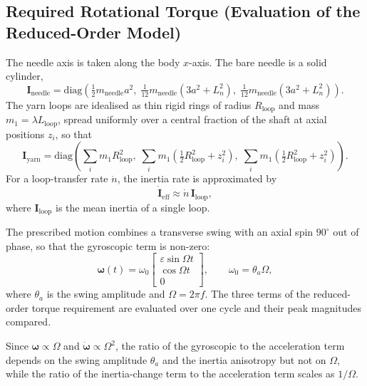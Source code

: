 \documentclass[12pt, a4paper]{article}
\begin{document}
\subsection{Required Rotational Torque (Evaluation of the Reduced-Order Model)}

The needle axis is taken along the body $x$-axis. The bare needle is a solid cylinder,
\begin{equation}
\mathbf{I}_{\text{needle}}
=
\mathrm{diag}\!\left(
\tfrac{1}{2}m_{\text{needle}}a^{2},\;
\tfrac{1}{12}m_{\text{needle}}(3a^{2}+L_n^{2}),\;
\tfrac{1}{12}m_{\text{needle}}(3a^{2}+L_n^{2})
\right).
\end{equation}
The yarn loops are idealised as thin rigid rings of radius $R_{\text{loop}}$ and mass $m_1=\lambda L_{\text{loop}}$, spread uniformly over a central fraction of the shaft at axial positions $z_i$, so that
\begin{equation}
\mathbf{I}_{\text{yarn}}
=
\mathrm{diag}\!\left(
\sum_i m_1R_{\text{loop}}^{2},\;
\sum_i m_1\!\left(\tfrac{1}{2}R_{\text{loop}}^{2}+z_i^{2}\right),\;
\sum_i m_1\!\left(\tfrac{1}{2}R_{\text{loop}}^{2}+z_i^{2}\right)
\right).
\end{equation}
For a loop-transfer rate $\dot n$, the inertia rate is approximated by
\begin{equation}
\dot{\mathbf{I}}_{\text{eff}}\approx\dot n\,\mathbf{I}_{\text{loop}},
\end{equation}
where $\mathbf{I}_{\text{loop}}$ is the mean inertia of a single loop.

The prescribed motion combines a transverse swing with an axial spin $90^\circ$ out of phase, so that the gyroscopic term is non-zero:
\begin{equation}
\boldsymbol{\omega}(t)
=
\omega_0
\begin{bmatrix}
\varepsilon\sin\Omega t\\
\cos\Omega t\\
0
\end{bmatrix},
\qquad
\omega_0=\theta_a\Omega,
\end{equation}
where $\theta_a$ is the swing amplitude and $\Omega=2\pi f$. The three terms of the reduced-order torque requirement are evaluated over one cycle and their peak magnitudes compared.

Since $\boldsymbol{\omega}\propto\Omega$ and $\dot{\boldsymbol{\omega}}\propto\Omega^{2}$, the ratio of the gyroscopic to the acceleration term depends on the swing amplitude $\theta_a$ and the inertia anisotropy but not on $\Omega$, while the ratio of the inertia-change term to the acceleration term scales as $1/\Omega$.
\end{document}
